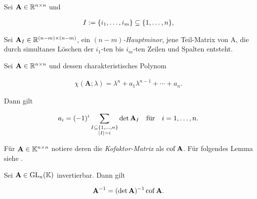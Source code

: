             \begin{definition} \label{def:principal_minors}

                Sei $\mathbf A \in \mathbb R^{n \times n}$ und

                \begin{align*}
                    I
                    :=
                    {\left \{ i_1, \dots, i_m \right \}}
                    \subseteq
                    {\left \{ 1, \dots, n \right \}},
                \end{align*}

                Sei $\mathbf A_I \in \mathbb R^{(n-m) \times (n-m)}$, ein \textit{$(n-m)$-Hauptminor}, jene Teil-Matrix von $\mathrm A$, die durch simultanes Löschen der $i_1$-ten bis $i_m$-ten Zeilen und Spalten entsteht.

            \end{definition}

            \begin{lemma} \label{lem:characteristic_coefficints}

                Sei $\mathbf A \in \mathbb R^{n \times n}$ und dessen charakteristisches Polynom

                \begin{align*}
                    \chi(\mathbf A; \lambda)
                    =
                    \lambda^n + a_1 \lambda^{n-1} + \cdots + a_n.
                \end{align*}

                Dann gilt

                \begin{align*}
                    a_i
                    =
                    (-1)^i
                    \sum_{\substack{I \subseteq {\left \{ 1, \dots, n \right \}} \\ |I| = i}}
                        \det \mathbf A_I
                    \quad
                    \text{für}
                    \quad
                    i = 1, \dots, n.
                \end{align*}

            \end{lemma}

            Für $\mathbf A \in \mathbb K^{n \times n}$ notiere deren die \textit{Kofaktor-Matrix} als $\operatorname{cof} \mathbf A$.
            Für folgendes Lemma siehe \cite[Kapitel 7.5]{LinAG1&2}.

            \begin{lemma} \label{lem:cofactor_inverse}

                Sei $\mathbf A \in \operatorname{GL}_n(\mathbb K)$ invertierbar.
                Dann gilt

                \begin{align*}
                    \mathbf A^{-1} = (\det \mathbf A)^{-1} \operatorname{cof} \mathbf A.
                \end{align*}

            \end{lemma}

